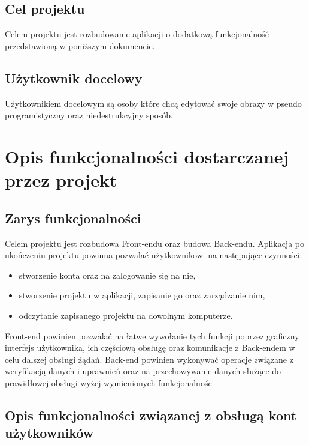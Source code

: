 \documentclass{article}
\begin{document}
\subsection{Cel projektu}
Celem projektu jest rozbudowanie aplikacji o dodatkową funkcjonalność przedstawioną w poniższym dokumencie.

\subsection{Użytkownik docelowy}
Użytkownikiem docelowym są osoby które chcą edytować swoje obrazy w pseudo programistyczny oraz niedestrukcyjny sposób.
\section{Opis funkcjonalności dostarczanej przez projekt}
\subsection{Zarys funkcjonalności}

Celem projektu jest rozbudowa Front-endu oraz budowa Back-endu. Aplikacja po ukończeniu projektu powinna pozwalać użytkownikowi na następujące czynności:
\begin{itemize}
    \item stworzenie konta oraz na zalogowanie się na nie,
    \item stworzenie projektu w aplikacji, zapisanie go oraz zarządzanie nim,
    \item odczytanie zapisanego projektu na dowolnym komputerze.
\end{itemize}

Front-end powinien pozwalać na łatwe wywołanie tych funkcji poprzez graficzny interfejs użytkownika, ich częściową obsługę oraz komunikacje z Back-endem w celu dalszej obsługi żądań.
Back-end powinien wykonywać operacje związane z weryfikacją danych i uprawnień oraz na przechowywanie danych służące do prawidłowej obsługi wyżej wymienionych funkcjonalności

\subsection{Opis funkcjonalności związanej z obsługą kont użytkowników}
\end{document}
